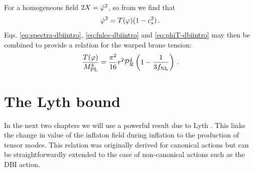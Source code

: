 For a homogeneous field $2X = \dot{\varphi}^2$, so from  we
find that
\begin{equation}
\label{eq:phiT-dbiintro}
 \dot{\varphi}^2 = T(\varphi)(1-c_s^2)\,.
\end{equation}
Eqs. \eqref{eq:spectra-dbiintro},
\eqref{eq:fnlcs-dbiintro} and \eqref{eq:phiT-dbiintro}
may then be combined to provide a relation for the warped brane tension: 
% 
\begin{equation}
\label{eq:obswarp-dbiintro}
\frac{T (\varphi)}{M_{\mathrm{PL}}^4}  = 
\frac{\pi^2}{16} r^2\mathcal{P}_{\mathcal{R}}^2  \left( 1-\frac{1}{3f_{\mathrm{NL}}} \right) \,.
\end{equation}
% 


\section{The Lyth bound}
\label{sec:lyth-dbiintro}
In the next two chapters we will use a powerful result due to Lyth \cite{lyth}. This
links the change in value of the inflaton field during inflation to the production of tensor
modes. This relation was originally derived for canonical actions but can be straightforwardly
extended to the case of non-canonical actions such as the DBI action.

